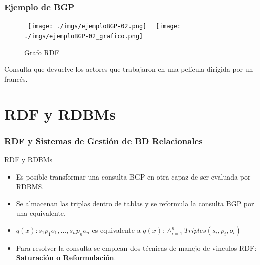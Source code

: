 \documentclass{beamer}
\begin{document}
\begin{frame}
\frametitle{Ejemplo de BGP}
\begin{figure}
        \hbox{%
                \texttt{[image: ./imgs/ejemploBGP-02.png]}%
        }%
        \hbox{%
                \texttt{[image: ./imgs/ejemploBGP-02\_grafico.png]}%
        }%
        \ifdim\ht0>\ht2
                \setbox0\hbox{%
                        \texttt{[image: ./imgs/ejemploBGP-02.png]}%
                }%
        \else
                \setbox2\hbox{%
                        \texttt{[image: ./imgs/ejemploBGP-02\_grafico.png]}%
                }%
        \fi
        \noindent
        \parbox{.45\textwidth}{%
                \centering
                \caption{Consulta RDF}
                \label{fg:methods}
        }%
        \hfil
        \parbox{.45\textwidth}{%
                \centering
                \caption{Grafo RDF}
                \label{fg:method_detail}
        }%
\end{figure}
\vspace*{1.2cm}
Consulta que devuelve los actores que trabajaron en una película dirigida por un francés.
\end{frame}

\section{RDF y RDBMs}
\begin{frame}
\frametitle{RDF y Sistemas de Gestión de BD Relacionales}

\begin{block}{RDF y RDBMs}
\begin{itemize}
\item Es posible transformar una consulta BGP en otra capaz de ser evaluada por RDBMS.
\vspace{1 mm}
\item Se almacenan las triplas dentro de tablas y se reformula la consulta BGP por una equivalente.
\vspace{1 mm}
\item $q(x) : s_{1} p_{1} o_{1}, ..., s_{n} p_{n} o_{n}$ es equivalente a $q(x): \wedge ^n _{i = 1} Triples(s_{i}, p_{i}, o_{i})$
\vspace{1 mm}
\item Para resolver la consulta se emplean dos técnicas de manejo de vinculos RDF: \textbf{Saturación o Reformulación}.
\end{itemize}
\end{block}
\end{frame}
\end{document}
